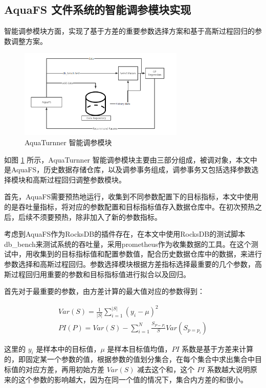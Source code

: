 \subsection{AquaFS 文件系统的智能调参模块实现}

智能调参模块方面，实现了基于方差的重要参数选择方案和基于高斯过程回归的参数调整方案。

\begin{figure}[htbp]
  \centering
  \includegraphics[width=0.7\textwidth]{fig/aquaturnner.png}
  \caption{AquaTurnner 智能调参模块}
  \label{aquaturnner}
\end{figure}

如图 \ref{aquaturnner} 所示，AquaTurnner 智能调参模块主要由三部分组成，被调对象，本文中是AquaFS，历史数据存储仓库，以及调参事务组成，调参事务又包括选择参数选择模块和高斯过程回归调整参数模块。

首先，AquaFS需要预热地运行，收集到不同参数配置下的目标指标，本文中使用的是吞吐量指标，将对应的参数配置和目标指标值存入数据仓库中。在初次预热之后，后续不须要预热，除非加入了新的参数指标。

考虑到AquaFS作为RocksDB的插件存在，在本文中使用RocksDB的测试脚本db\_bench来测试系统的吞吐量，采用prometheus作为收集数据的工具。在这个测试中，用收集到的目标指标值和配置参数值，配合历史数据仓库中的数据，来进行参数选择和高斯过程回归。参数选择模块根据方差指标选择最重要的几个参数，高斯过程回归用重要的参数和目标指标值进行拟合以及回归。

首先对于最重要的参数，由方差计算的最大值对应的参数得到：

\begin{equation}
  \label{eq:var}
  \begin{aligned}
    Var(S)=\frac{1}{\lvert S\rvert}\sum_{i=1}^{\lvert S\rvert}(y_i-\mu)^2 \\
    PI(P)=Var(S)-\sum_{i=1}^{N}\frac{S_{P=P_i}}{S}Var(S_{p=p_i})
  \end{aligned}
\end{equation}

这里的 $y_i$ 是样本中的目标值，$\mu$ 是样本目标值均值，$PI$ 系数是基于方差来计算的，即固定某一个参数的值，根据参数的值划分集合，在每个集合中求出集合中目标值的对应方差，再用初始方差 $Var(S)$ 减去这个和，这个 $PI$ 系数越大说明原来的这个参数的影响越大，因为在同一个值的情况下，集合内方差的和很小。

